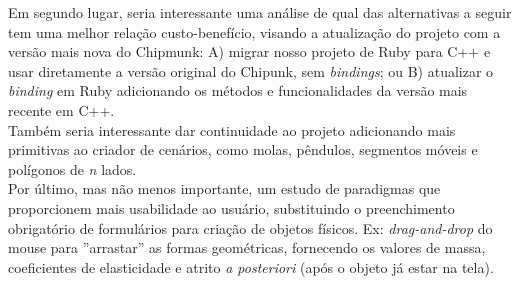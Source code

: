 Em segundo lugar, seria interessante uma análise de qual das alternativas a seguir tem uma melhor relação custo-benefício, visando a atualização do projeto com a versão mais nova do Chipmunk: A) migrar nosso projeto de Ruby para C++ e usar diretamente a versão original do Chipunk, sem \textit{bindings}; ou B) atualizar o \textit{binding} em Ruby adicionando os métodos e funcionalidades da versão mais recente em C++.\\

Também seria interessante dar continuidade ao projeto adicionando mais primitivas ao criador de cenários, como molas, pêndulos, segmentos móveis e polígonos de \textit{n} lados. \\

Por último, mas não menos importante, um estudo de paradigmas que proporcionem mais usabilidade ao usuário, substituindo o preenchimento obrigatório de formulários para criação de objetos físicos. Ex: \textit{drag-and-drop} do mouse para ''arrastar'' as formas geométricas, fornecendo os valores de massa, coeficientes de elasticidade e atrito \textit{a posteriori} (após o objeto já estar na tela).\\

